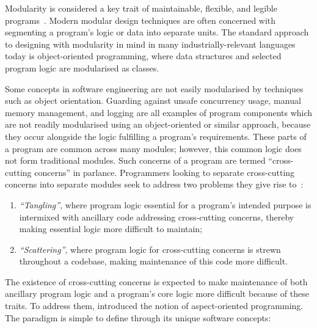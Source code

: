 Modularity is considered a key trait of maintainable, flexible, and legible
programs~\cite{Parnas_1972,dijkstra1968letters}. Modern modular design
techniques are often concerned with segmenting a program's logic or data into
separate units. The standard approach to designing with modularity in mind in
many industrially-relevant languages today is object-oriented programming, where
data structures and selected program logic are modularised as
classes.

Some concepts in software engineering are not easily modularised by techniques
such as object orientation. Guarding against unsafe concurrency usage, manual
memory management, and logging are all examples of program components which are
not readily modularised using an object-oriented or similar approach, because
they occur alongside the logic fulfilling a program's requirements. These parts
of a program are common across many modules; however, this common logic does not
form traditional modules. Such concerns of a program are termed ``cross-cutting
concerns'' in \aop{} parlance. Programmers looking to separate cross-cutting
concerns into separate modules seek to address two
problems they give rise to~\cite{kiczales1997aspect}:

\begin{enumerate}
    \item \emph{``Tangling''}, where program logic essential for
    a program's intended purpose is intermixed with ancillary code addressing
    cross-cutting concerns, thereby making essential logic more difficult to
    maintain;
    \item \emph{``Scattering''}, where program logic for
    cross-cutting concerns is strewn throughout a codebase, making maintenance
    of this code more difficult.
\end{enumerate}

The existence of cross-cutting concerns is expected to make maintenance of both
ancillary program logic and a program's core logic more difficult because of
these traits. To address them, \citet{kiczales1997aspect} introduced the notion
of aspect-oriented programming. The paradigm is simple to define through its
unique software concepts:

